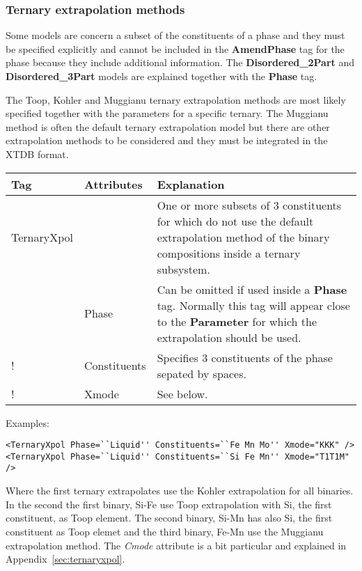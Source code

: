 \documentclass{article}
\begin{document}
\subsubsection{Ternary extrapolation methods}\label{sec:toop}

Some models are concern a subset of the constituents of a phase and
they must be specified explicitly and cannot be included in the {\bf
  AmendPhase} tag for the phase because they include additional
information.  The {\bf Disordered\_2Part} and {\bf Disordered\_3Part}
models are explained together with the {\bf Phase} tag.

The Toop, Kohler and Muggianu ternary extrapolation methods are most
likely specified together with the parameters for a specific ternary.
The Muggianu method is often the default ternary extrapolation model
but there are other extrapolation methods to be considered and they
must be integrated in the XTDB format.

\begin{tabular}{|p{} p{} p{}|}\hline
  Tag & Attributes & Explanation\\\hline

  TernaryXpol & & One or more subsets of 3 constituents for which do not 
              use the default
              extrapolation method of the binary compositions inside
              a ternary subsystem.\\
       & Phase & Can be omitted if used inside a {\bf Phase} tag.  Normally  
              this tag will appear close to the {\bf Parameter} for which the
              extrapolation should be used.\\
!      & Constituents & Specifies 3 constituents of the phase sepated by
          spaces.\\
!      & Xmode & See below.\\\hline
\end{tabular}

Examples:

\begin{verbatim}
<TernaryXpol Phase=``Liquid'' Constituents=``Fe Mn Mo'' Xmode="KKK" />
<TernaryXpol Phase=``Liquid'' Constituents=``Si Fe Mn'' Xmode="T1T1M" />
\end{verbatim}

Where the first ternary extrapolates use the Kohler extrapolation for
all binaries.  In the second the first binary, Si-Fe use Toop
extrapolation with Si, the first constituent, as Toop element.  The
second binary, Si-Mn has also Si, the first constituent as Toop elemet
and the third binary, Fe-Mn use the Muggianu extrapolation method.
The {\em Cmode} attribute is a bit particular and explained in
Appendix~\ref{sec:ternaryxpol}.
\end{document}
